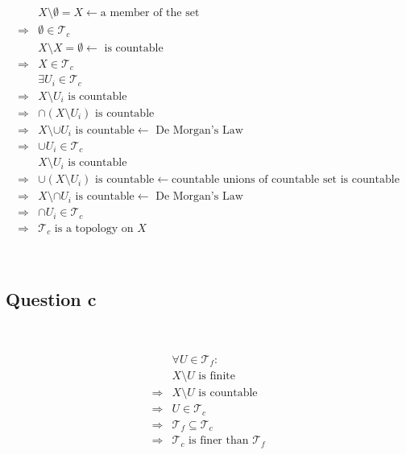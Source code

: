 \documentclass{article}
\begin{document}
\begin{equation*}
    \begin{split}
        &X\setminus \emptyset=X\leftarrow\text{a member of the set}\\
        \Rightarrow&\emptyset\in \mathcal{T}_c\\
        &X\setminus X=\emptyset\leftarrow \text{ is countable}\\
        \Rightarrow&X\in\mathcal{T}_c\\
        &\exists U_i\in \mathcal{T}_c\\
        \Rightarrow&X\setminus U_i \text{ is countable}\\
        \Rightarrow&\cap(X\setminus U_i)\text{ is countable}\\
        \Rightarrow&X\setminus \cup U_i\text{ is countable}\leftarrow \text{ De Morgan's Law}\\
        \Rightarrow&\cup U_i\in \mathcal{T}_c\\
        &X\setminus U_i \text{ is countable}\\
        \Rightarrow&\cup(X\setminus U_i)\text{ is countable}\leftarrow\text{countable unions of countable set is countable}\\
        \Rightarrow&X\setminus \cap U_i\text{ is countable}\leftarrow \text{ De Morgan's Law}\\
        \Rightarrow&\cap U_i\in \mathcal{T}_c\\
        \Rightarrow& \mathcal{T}_c\text { is a topology on }X
    \end{split}
\end{equation*}

~

\subsection*{Question c}

~

\begin{equation*}
    \begin{split}
        &\forall U\in\mathcal{T}_f:\\
        &X\setminus U\text{ is finite}\\
        \Rightarrow&X\setminus U\text{ is countable}\\
        \Rightarrow&U\in \mathcal{T}_c\\
        \Rightarrow&\mathcal{T}_f\subseteq \mathcal{T}_c\\
        \Rightarrow&\mathcal{T}_c\text{ is finer than }\mathcal{T}_f\\
    \end{split}
\end{equation*}
\end{document}
